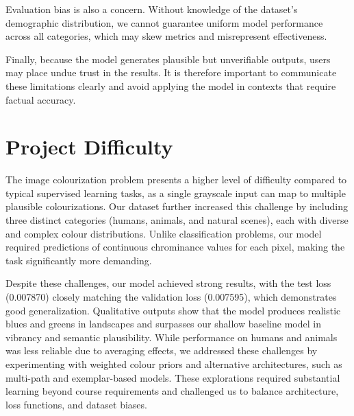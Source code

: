 \documentclass{article} %
\begin{document}
Evaluation bias is also a concern. Without knowledge of the dataset's demographic distribution, we cannot guarantee uniform model performance across all categories, which may skew metrics 
and misrepresent effectiveness.

Finally, because the model generates plausible but unverifiable outputs, users may place undue trust in the results. It is therefore important to communicate these limitations clearly and 
avoid applying the model in contexts that require factual accuracy.

\section{Project Difficulty}
\label{difficulty}

The image colourization problem presents a higher level of difficulty compared to typical supervised learning tasks, as a single grayscale input can map to multiple 
plausible colourizations. Our dataset further increased this challenge by including three distinct categories (humans, animals, and natural scenes), each with diverse and complex colour distributions.
Unlike classification problems, our model required predictions of continuous chrominance values for each pixel, making the task significantly more demanding.

Despite these challenges, our model achieved strong results, with the test loss (0.007870) closely matching the validation loss (0.007595), which demonstrates good 
generalization. Qualitative outputs show that the model produces realistic blues and greens in landscapes and surpasses our shallow baseline model in vibrancy and semantic plausibility. While performance 
on humans and animals was less reliable due to averaging effects, we addressed these challenges by experimenting with weighted colour priors and alternative architectures, such as multi-path and 
exemplar-based models. These explorations required substantial learning beyond course requirements and challenged us to balance architecture, loss functions, and dataset biases.

\label{last_page}

\newpage


\end{document}
